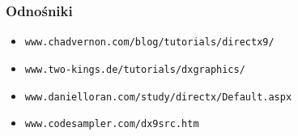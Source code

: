 \documentclass{beamer}
\begin{document}
\begin{frame}[fragile]
\frametitle{Odnośniki}

\begin{itemize}
  \item \texttt{www.chadvernon.com/blog/tutorials/directx9/}
  \item \texttt{www.two-kings.de/tutorials/dxgraphics/}
  \item \texttt{www.danielloran.com/study/directx/Default.aspx}
  \item \texttt{www.codesampler.com/dx9src.htm}
\end{itemize}
\end{frame}
\end{document}
